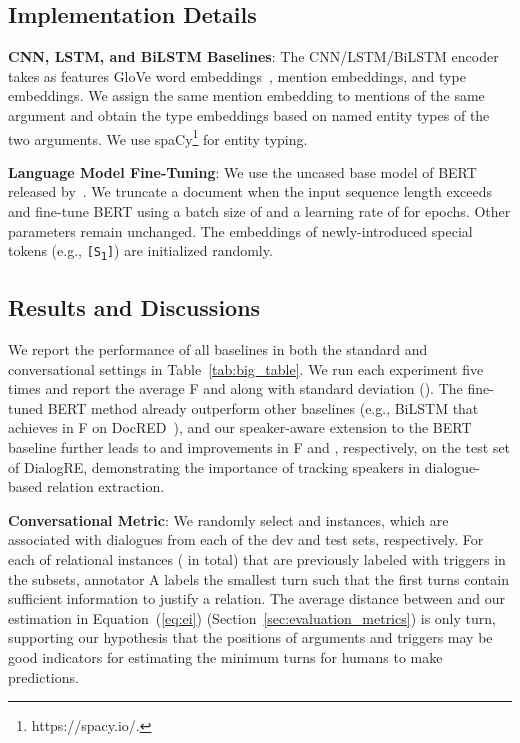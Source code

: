 \documentclass[11pt,a4paper]{article}
\newcommand{\eg}{{e.g.}}
\begin{document}
\subsection{Implementation Details}







\noindent \textbf{CNN, LSTM, and BiLSTM Baselines}: The CNN/LSTM/BiLSTM encoder takes as features GloVe word embeddings~\cite{pennington2014glove}, mention embeddings, and type embeddings. We assign the same mention embedding to mentions of the same argument and obtain the type embeddings based on named entity types of the two arguments. We use spaCy\footnote{https://spacy.io/.} for entity typing.






\medskip

\noindent \textbf{Language Model Fine-Tuning}:
We use the uncased base model of BERT released by~\citet{bert2018}. We truncate a document when the input sequence length exceeds  and fine-tune BERT using a batch size of  and a learning rate of  for  epochs. Other parameters remain unchanged. The embeddings of newly-introduced special tokens (\eg, \texttt{[S\textsubscript{1}]}) are initialized randomly. 















\subsection{Results and Discussions}
\label{sec:sec:results}


We report the performance of all baselines in both the standard and conversational settings in Table~\ref{tab:big_table}. We run each experiment five times and report the average F and  along with standard deviation (). The fine-tuned BERT method already outperform other baselines (\eg, BiLSTM that achieves  in F on DocRED~\cite{yao2019docred}), and our speaker-aware extension to the BERT baseline further leads to  and  improvements in F and , respectively, on the test set of DialogRE, demonstrating the importance of tracking speakers in dialogue-based relation extraction.

\medskip
\noindent \textbf{Conversational Metric}: 
We randomly select  and  instances, which are associated with  dialogues from each of the dev and test sets, respectively. For each of relational instances ( in total) that are previously labeled with triggers in the subsets, annotator A labels the smallest turn  such that the first  turns contain sufficient information to justify a relation. The average distance between  and our estimation  in Equation~(\ref{eq:ei}) (Section~\ref{sec:evaluation_metrics}) is only  turn, supporting our hypothesis that the positions of arguments and triggers may be good indicators for estimating the minimum turns for humans to make predictions.
\end{document}
